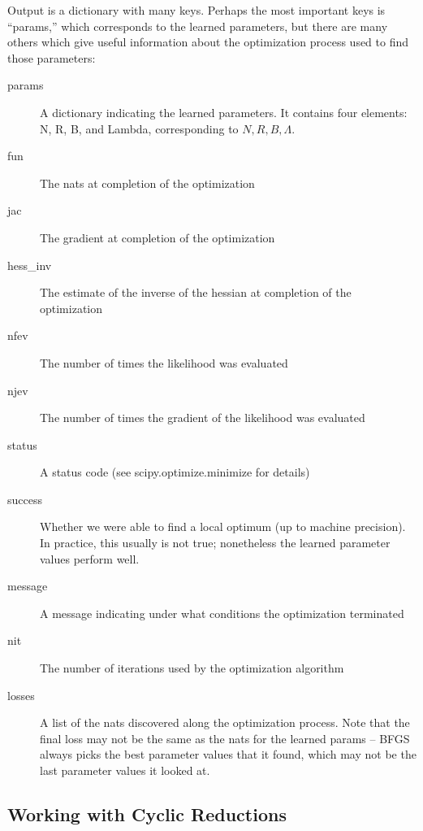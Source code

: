 \documentclass{article}
\theoremstyle{definition}
\begin{document}
\begin{description}
        Output is a dictionary with many keys.  Perhaps the most important keys is ``params,'' which corresponds to the learned parameters, but there are many others which give useful information about the optimization process used to find those parameters:

        \begin{description}
            \item[params] A dictionary indicating the learned parameters.  It contains four elements: N, R, B, and Lambda, corresponding to $N,R,B,\Lambda$.  
            \item[fun] The nats at completion of the optimization
            \item[jac] The gradient at completion of the optimization
            \item[hess\_inv] The estimate of the inverse of the hessian at completion of the optimization
            \item[nfev] The number of times the likelihood was evaluated
            \item[njev] The number of times the gradient of the likelihood was evaluated 
            \item[status] A status code (see scipy.optimize.minimize for details)
            \item[success] Whether we were able to find a local optimum (up to machine precision).  In practice, this usually is not true; nonetheless the learned parameter values perform well.
            \item[message] A message indicating under what conditions the optimization terminated
            \item[nit] The number of iterations used by the optimization algorithm
            \item[losses] A list of the nats discovered along the optimization process.  Note that the final loss may not be the same as the nats for the learned params -- BFGS always picks the best parameter values that it found, which may not be the last parameter values it looked at.
        \end{description}

    

\end{description}


\subsection{Working with Cyclic Reductions}
\end{document}
